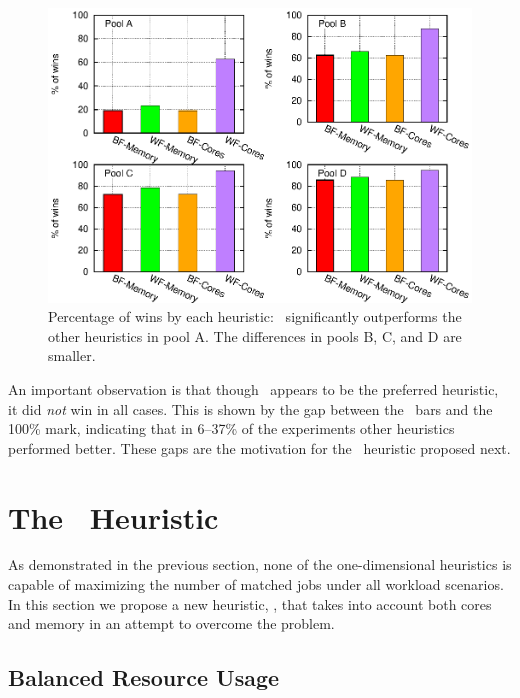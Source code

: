 
\begin{figure}\centering                      
	\includegraphics[width=.9\textwidth]{figures/buckets-all-no-mf.eps}
\caption{\label{fig:buckets}Percentage of wins by each heuristic:
  \wfc\ significantly outperforms the other heuristics in pool A. The
  differences in pools B, C, and D are smaller.}
\end{figure}

An important observation is that though \wfc\ appears to be the preferred heuristic, 
it did \textit{not} win in all cases. 
This is shown by the gap between the \wfc\ bars 
and the 100\% mark, indicating that in 6--37\% of the experiments
other heuristics performed better. 
These gaps are the motivation for the \mif\ heuristic
proposed next. 


\chapter{The \mif\ Heuristic}
\label{sec:mixed-fit}

As demonstrated in the previous section, none of the one-dimensional
heuristics is capable of maximizing the number of matched jobs under
all workload scenarios.
In this section we propose a new heuristic, \mif, that takes into
account both cores and memory in an attempt to overcome the problem.


\section{Balanced Resource Usage}

